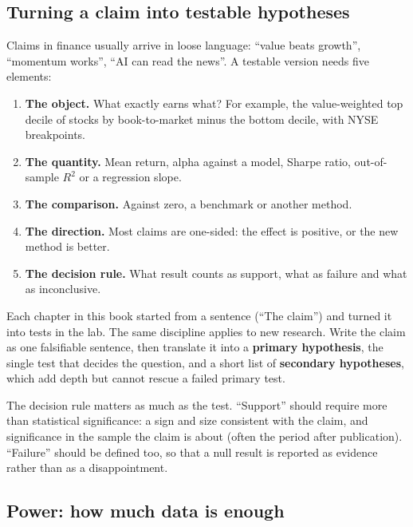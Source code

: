 \subsection{Turning a claim into testable hypotheses}
\label{sec:23-hypotheses}

Claims in finance usually arrive in loose language: ``value beats growth'', ``momentum works'', ``AI can read the news''. A testable version needs five elements:

\begin{enumerate}
  \item \textbf{The object.} What exactly earns what? For example, the value-weighted top decile of stocks by book-to-market minus the bottom decile, with NYSE breakpoints.
  \item \textbf{The quantity.} Mean return, alpha against a model, Sharpe ratio, out-of-sample $R^2$ or a regression slope.
  \item \textbf{The comparison.} Against zero, a benchmark or another method.
  \item \textbf{The direction.} Most claims are one-sided: the effect is positive, or the new method is better.
  \item \textbf{The decision rule.} What result counts as support, what as failure and what as inconclusive.
\end{enumerate}

Each chapter in this book started from a sentence (``The claim'') and turned it into tests in the lab. The same discipline applies to new research. Write the claim as one falsifiable sentence, then translate it into a \textbf{primary hypothesis}, the single test that decides the question, and a short list of \textbf{secondary hypotheses}, which add depth but cannot rescue a failed primary test.

The decision rule matters as much as the test. ``Support'' should require more than statistical significance: a sign and size consistent with the claim, and significance in the sample the claim is about (often the period after publication). ``Failure'' should be defined too, so that a null result is reported as evidence rather than as a disappointment.

\subsection{Power: how much data is enough}
\label{sec:23-power}

